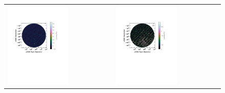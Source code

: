 \begin{figure}
\hspace{-2cm}\begin{tabular}{ll}
\includegraphics[clip, trim=0.5cm 11cm 4cm 5cm, width=0.6\textwidth]{chapters/polcal/figures/68380-I-better.pdf} &
\includegraphics[clip, trim=0.5cm 11cm 4cm 5cm, width=0.6\textwidth]{chapters/polcal/figures/68380-Q-better.pdf} \\

\end{tabular}
\end{figure}
